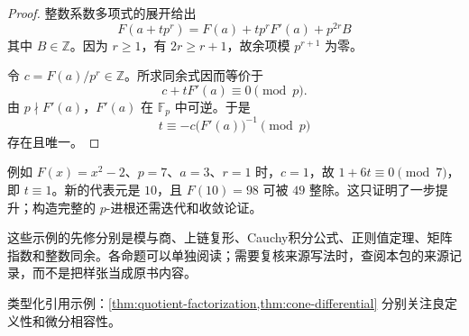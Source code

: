 \documentclass[11pt,a4paper,fontset=fandol,scheme=plain]{ctexart}
\begin{document}
\begin{proof}

整数系数多项式的展开给出
\[
F(a+t p^r)=F(a)+t p^rF'(a)+p^{2r}B
\]
其中 $B\in\mathbb Z$。因为 $r\ge1$，有 $2r\ge r+1$，故余项模 $p^{r+1}$ 为零。

令 $c=F(a)/p^r\in\mathbb Z$。所求同余式因而等价于
\[
c+tF'(a)\equiv0\pmod p.
\]
由 $p\nmid F'(a)$，$F'(a)$ 在 $\mathbb F_p$ 中可逆。于是
\[
t\equiv-c\bigl(F'(a)\bigr)^{-1}\pmod p
\]
存在且唯一。
\end{proof}

例如 $F(x)=x^2-2$、$p=7$、$a=3$、$r=1$ 时，$c=1$，故 $1+6t\equiv0\pmod7$，即 $t\equiv1$。新的代表元是 $10$，且 $F(10)=98$ 可被 $49$ 整除。这只证明了一步提升；构造完整的 $p$-进根还需迭代和收敛论证。

\medskip\noindent\small 这些示例的先修分别是模与商、上链复形、Cauchy积分公式、正则值定理、矩阵指数和整数同余。各命题可以单独阅读；需要复核来源写法时，查阅本包的来源记录，而不是把样张当成原书内容。

\par\smallskip\noindent\small 类型化引用示例：\cref{thm:quotient-factorization,thm:cone-differential} 分别关注良定义性和微分相容性。
\end{document}

